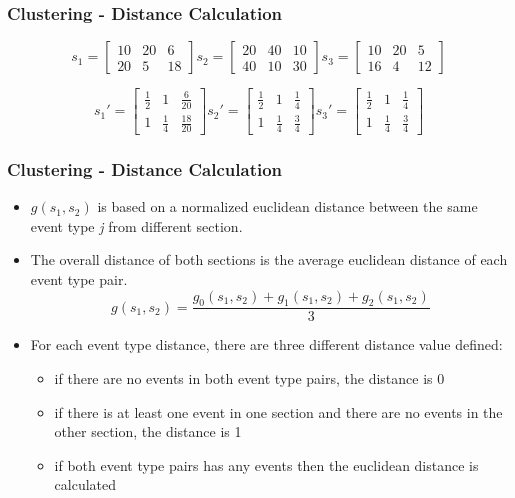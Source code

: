 \documentclass{beamer}
\begin{document}
\begin{frame}
\frametitle{Clustering - Distance Calculation}
\[
\textit{s}_1 = \begin{bmatrix}
  10 & 20 & 6\\
  20 & 5 & 18
\end{bmatrix}
\textit{s}_2 = \begin{bmatrix}
  20 & 40 & 10\\ 
  40 & 10 & 30
\end{bmatrix}
\textit{s}_3 = \begin{bmatrix}
  10 & 20 & 5\\
  16 & 4 & 12 
\end{bmatrix}
\]

\[
s_1' = \begin{bmatrix}
  \frac{1}{2} & 1 & \frac{6}{20}\\ 
  1 & \frac{1}{4} & \frac{18}{20}
\end{bmatrix}
s_2' = \begin{bmatrix}
  \frac{1}{2} & 1 & \frac{1}{4}\\
  1 & \frac{1}{4} & \frac{3}{4} 
\end{bmatrix}
s_3' = \begin{bmatrix}
  \frac{1}{2} & 1 & \frac{1}{4}\\
  1 & \frac{1}{4} & \frac{3}{4} 
\end{bmatrix}
\]
\end{frame}
\begin{frame}
\frametitle{Clustering - Distance Calculation}
\begin{itemize}
\item $\textit{g}(\textit{s}_1,\textit{s}_2)$ is based on a normalized euclidean distance between the same event type \textit{j} from different section. 
\item The overall distance of both sections is the average euclidean distance of each event type pair. 
$$\textit{g}(\textit{s}_1,\textit{s}_2) = \frac{\textit{g}_0(\textit{s}_1,\textit{s}_2) + \textit{g}_1(\textit{s}_1,\textit{s}_2) + \textit{g}_2(\textit{s}_1,\textit{s}_2)}{3}$$
\item For each event type distance, there are three different distance value defined:
\begin{itemize}
\item if there are no events in both event type pairs, the distance is 0 
\item if there is at least one event in one section and there are no events in the other section, the distance is 1
\item if both event type pairs has any events then the euclidean distance is calculated
\end{itemize}

\end{itemize}
\end{frame}
\end{document}
